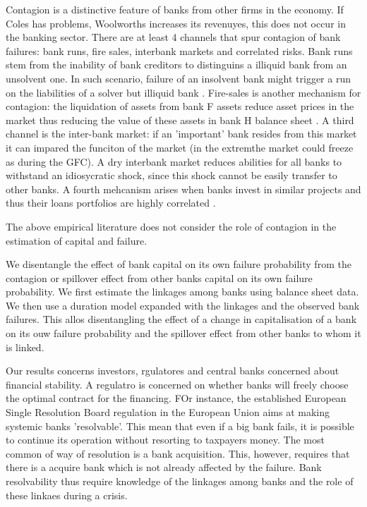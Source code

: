 \documentclass[11pt,final]{article}%
\begin{document}
Contagion is a distinctive feature of banks from other firms in the economy. If Coles has problems, Woolworths increases its revenuyes, this does not occur in the banking sector.  There are at least 4 channels that spur contagion of bank failures: bank runs, fire sales, interbank markets and correlated risks. Bank runs stem from the inability of bank creditors to distinguins a illiquid bank from an unsolvent one. In such scenario, failure of an insolvent bank might trigger a run on the liabilities of a solver but illiquid bank \cite{DiamondDybvig1983}. Fire-sales is another mechanism for contagion: the liquidation of assets from bank F assets reduce asset prices in the market thus reducing the value of these assets in bank H balance sheet  \cite{Walther2016}.
A third channel is the inter-bank market: if an 'important' bank resides from this market it can impared the funciton of the market (in the extremthe market could freeze as during the GFC). A dry interbank market reduces abilities for all banks to withstand an idiosycratic shock, since this shock cannot be easily transfer to other banks. 
A fourth mehcanism arises when banks invest in similar projects and thus their loans portfolios are highly correlated \cite{FarhiTirole2012}.





The above empirical literature does not consider the role of contagion in the estimation of capital and failure.

We disentangle the effect of bank capital on its own failure probability from the contagion or spillover effect from other banks capital on its own failure probability. We first estimate the linkages among banks using balance sheet data. We then use a duration model expanded with the linkages and the observed bank failures. This allos disentangling the effect of a change in capitalisation of a bank on its ouw failure probability and the spillover effect from other banks to whom it is linked. 

Our results  concerns investors, rgulatores and central banks concerned about financial stability. 
 A regulatro is concerned on whether banks will freely choose the optimal contract for the financing. FOr instance, the established European Single Resolution Board regulation in the European Union  aims at making systemic banks 'resolvable'. This mean that even if a big bank fails, it is possible to continue its operation without resorting to taxpayers money. The most common of way of resolution is a bank acquisition. This, however, requires that there is a acquire bank which is not already affected by the failure. Bank resolvability thus require knowledge of the linkages among banks and the role of these linkaes during a crisis. 
 
\end{document}
